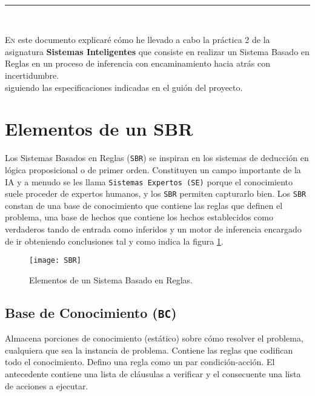 
\begin{center}
	{\fboxrule=4pt } \\
	\setcounter{chapter}{1}
	\setcounter{section}{0}
	\rule{15cm}{0pt} \\
\end{center}

 
 \lettrine[lines=3, depth = 0]{E}{n} este documento explicar\'e c\'omo he llevado a cabo la práctica 2 de la asignatura \textbf{Sistemas Inteligentes} que consiste 
 en realizar un Sistema Basado en Reglas en un proceso de inferencia con encaminamiento hacia atrás con incertidumbre.
 \\siguiendo las especificaciones indicadas en el gui\'on del proyecto.
 
\section{Elementos de un SBR}
\par Los Sistemas Basados en Reglas (\texttt{SBR}) se inspiran en los sistemas de deducción en 
lógica proposicional o de primer orden. Constituyen un campo importante de la IA y 
a menudo se les llama \texttt{Sistemas Expertos (SE)} porque el conocimiento suele proceder de 
expertos humanos, y los \texttt{SBR} permiten capturarlo bien. Los \texttt{SBR}  constan de una base de 
conocimiento que contiene las reglas que definen el problema, una base de hechos que contiene los hechos 
establecidos como verdaderos tando de entrada como inferidos y un motor de inferencia encargado de ir 
obteniendo conclusiones tal y como indica la figura \ref{fig:SBR}.
 \begin{figure}[H]
	\texttt{[image: SBR]}
	\centering
	\caption{Elementos de un Sistema Basado en Reglas.}
    	\label{fig:SBR}
\end{figure}


	\subsection{Base de Conocimiento (\texttt{BC})}
	\par Almacena porciones de conocimiento (estático) sobre cómo resolver el problema,
	cualquiera que sea la instancia de problema. Contiene las reglas que codifican todo el conocimiento. Defino una regla como un par condición-acción. 
	El antecedente contiene una lista de cláusulas a verificar y el consecuente una lista de acciones a ejecutar.

